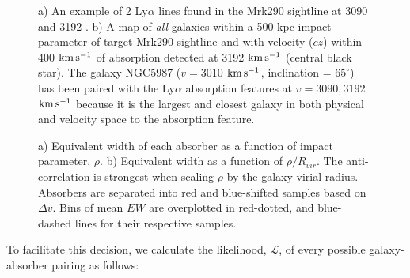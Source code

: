 \documentclass[twocolumn,tighten]{aastex6}
\begin{document}
\begin{figure}[t!]
  \caption{\small{a) An example of 2 Ly$\alpha$ lines found in the Mrk290 sightline at 3090 and 3192 . b) A map of \textit{all} galaxies within a 500 kpc impact parameter of target Mrk290 sightline and with velocity ($cz$) within 400 $\rm km\, s^{-1}$ of absorption detected at 3192 $\rm km\, s^{-1}$ (central black star). The galaxy NGC5987 ($v=3010$ $\rm km\, s^{-1}$, inclination = $65^{\circ}$) has been paired with the Ly$\alpha$ absorption features at $v=3090, 3192$ $\rm km\, s^{-1}$ because it is the largest and closest galaxy in both physical and velocity space to the absorption feature.}}
\vspace{5pt}
\end{figure}

\begin{figure}[t]
\centering
{}
\caption{\small{a) Equivalent width of each absorber as a function of impact parameter, $\rho$. b) Equivalent width as a function of $\rho/R_{vir}$. The anti-correlation is strongest when scaling $\rho$ by the galaxy virial radius. Absorbers are separated into red and blue-shifted samples based on $\Delta v$. Bins of mean $EW$ are overplotted in red-dotted, and blue-dashed lines for their respective samples.}}
\vspace{5pt}
\end{figure}


To facilitate this decision, we calculate the likelihood, $\mathcal{L}$, of every possible galaxy-absorber pairing as follows:
\end{document}
